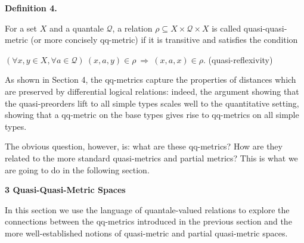  
 
\par\medskip\noindent\textbf{Definition 4.}\par
 
 
For a set $X$ and a quantale $\mathcal{Q}$, a relation $\rho\subseteq X\times\mathcal{Q}\times X$ is called quasi-quasi-metric (or more concisely qq-metric) if it is transitive and satisfies the condition\par
    $\displaystyle(\forall x,y\in X,\forall a\in\mathcal{Q})\ (x,a,y)\in\rho\ %
\Rightarrow\ (x,a,x)\in\rho.$  (quasi-reflexivity)   
 
 
 
As shown in Section 4, the qq-metrics capture the properties of distances which are preserved by differential logical relations: indeed, the argument showing that the quasi-preorders lift to all simple types scales well to the quantitative setting, showing that a qq-metric on the base types gives rise to qq-metrics on all simple types.\par
 
 
 
The obvious question, however, is: what are these qq-metrics? How are they related to the more standard quasi-metrics and partial metrics? This is what we are going to do in the following section.\par
 
 
 


 
\par\medskip\noindent\textbf{3 Quasi-Quasi-Metric Spaces}\par
 
 
In this section we use the language of quantale-valued relations to explore the connections between the qq-metrics introduced in the previous section and the more well-established notions of quasi-metric and partial quasi-metric spaces.\par
 
